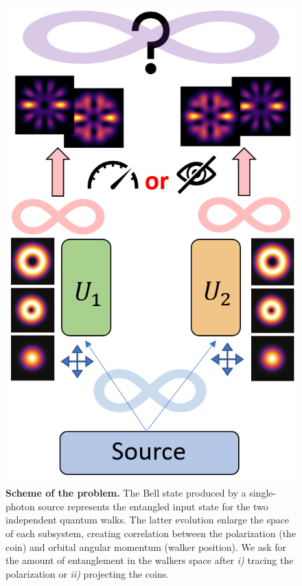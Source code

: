 \documentclass[
	aps, pra, authorblock, superscriptaddress, twocolumn,
	10pt
]{revtex4-1}
\begin{document}
\begin{figure}[b]
    \centering
    \includegraphics[scale=0.35]{concept.png}
    \caption{\textbf{Scheme of the problem.} The Bell state produced by a single-photon source represents the entangled input state for the two independent quantum walks. The latter evolution enlarge the space of each subsystem, creating correlation between the polarization (the coin) and orbital angular momentum (walker position). We ask for the amount of entanglement in the walkers space after \textit{i)} tracing the polarization or \textit{ii)} projecting the coins. }
    \label{fig:concept}
\end{figure}
\end{document}
